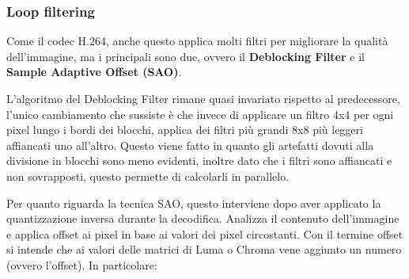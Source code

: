 \documentclass[a4paper,12pt, oneside]{article}
\begin{document}
\subsubsection{Loop filtering}
Come il codec H.264, anche questo applica molti filtri per migliorare la qualità dell'immagine, ma i principali
sono due, ovvero il \textbf{Deblocking Filter} e il \textbf{Sample Adaptive Offset (SAO)}.

L'algoritmo del Deblocking Filter rimane quasi invariato rispetto al predecessore, l'unico cambiamento che sussiste è che invece
di applicare un filtro 4x4 per ogni pixel lungo i bordi dei blocchi, applica dei filtri più grandi 8x8 più
leggeri affiancati uno all'altro. Questo viene fatto in quanto gli artefatti dovuti alla divisione in blocchi
sono meno evidenti, inoltre dato che i filtri sono affiancati e non sovrapposti, questo permette di calcolarli
in parallelo.

Per quanto riguarda la tecnica SAO, questo interviene dopo aver applicato la quantizzazione inversa durante
la decodifica. Analizza il contenuto dell'immagine e applica offset ai pixel in base ai valori dei pixel
circostanti. Con il termine offset si intende che ai valori delle matrici di Luma o Chroma vene aggiunto un
numero (ovvero l'offset).
In particolare:
\end{document}
